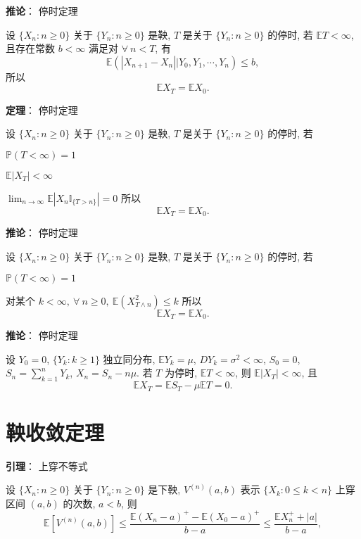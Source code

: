 \documentclass[openany]{ctexbook}
\theoremstyle{kaiti}
\theoremstyle{normal}
\begin{document}
\textbf{推论}： 停时定理

设 $\{X_n:n\geqslant0\}$ 关于 $\{Y_n:n\geqslant0\}$ 是鞅, $T$ 是关于 $\{Y_n:n\geqslant0\}$ 的停时, 若 $\mathbb{E}T<\infty$, 且存在常数 $b<\infty$ 满足对 $\forall~n< T$, 有
\begin{equation}
  \mathbb{E}(|X_{n+1}-X_n|\big|Y_0,Y_1,\cdots,Y_n)\leqslant b,
\end{equation}
所以 
\begin{equation}
  \mathbb{E}X_T=\mathbb{E}X_0.
\end{equation}

\textbf{定理}： 停时定理

设 $\{X_n:n\geqslant0\}$ 关于 $\{Y_n:n\geqslant0\}$ 是鞅, $T$ 是关于 $\{Y_n:n\geqslant0\}$ 的停时, 若

$\mathbb{P}(T<\infty)=1$

$\mathbb{E}|X_T|<\infty$

$\lim_{n\to\infty}\mathbb{E}|X_n\mathbb{I}_{\{T>n\}}|=0$
所以 
\begin{equation}
  \mathbb{E}X_T=\mathbb{E}X_0.
\end{equation}

\textbf{推论}： 停时定理

设 $\{X_n:n\geqslant0\}$ 关于 $\{Y_n:n\geqslant0\}$ 是鞅, $T$ 是关于 $\{Y_n:n\geqslant0\}$ 的停时, 若

$\mathbb{P}(T<\infty)=1$

对某个 $k<\infty,~\forall~n\geqslant0,~\mathbb{E}(X_{T\wedge n}^2)\leqslant k$
所以 
\begin{equation}
  \mathbb{E}X_T=\mathbb{E}X_0.
\end{equation}

\textbf{推论}： 停时定理

设 $Y_0=0$, $\{Y_k:k\geqslant1\}$ 独立同分布, $\mathbb{E}Y_k=\mu$, $DY_k=\sigma^2<\infty$, $S_0=0$, $S_n=\sum_{k=1}^nY_k$, $X_n=S_n-n\mu$. 若 $T$ 为停时, $\mathbb{E}T<\infty$, 则 $\mathbb{E}|X_T|<\infty$, 且 
\begin{equation}
  \mathbb{E}X_T=\mathbb{E}S_T-\mu \mathbb{E}T=0.
\end{equation}

\section{鞅收敛定理}

\textbf{引理}： 上穿不等式

设 $\{X_n:n\geqslant0\}$ 关于 $\{Y_n:n\geqslant0\}$ 是下鞅, $V^{(n)}(a,b)$ 表示 $\{X_k:0\leqslant k< n\}$ 上穿区间 $(a,b)$ 的次数, $a< b$, 则
\begin{equation}
  \mathbb{E}[V^{(n)}(a,b)]\leqslant\frac{\mathbb{E}(X_n-a)^+-\mathbb{E}(X_0-a)^+}{b-a}\leqslant\frac{\mathbb{E}X_n^++|a|}{b-a},
\end{equation}
\end{document}
